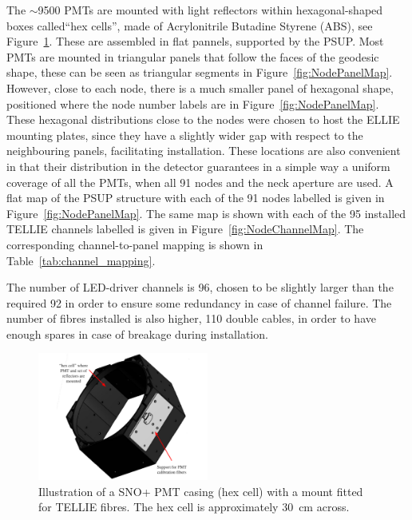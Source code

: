 \documentclass[12pt]{report}
\begin{document}
The $\sim$9500 PMTs are mounted with light reflectors within hexagonal-shaped boxes called``hex cells'', made of Acrylonitrile Butadine Styrene (ABS), see Figure~\ref{fig:HexCell}. These are assembled in flat pannels, supported by the PSUP. Most PMTs are mounted in triangular panels that follow the faces of the geodesic shape, these can be seen as triangular segments in Figure~\ref{fig:NodePanelMap}. However, close to each node, there is a much smaller panel of hexagonal shape, positioned where the node number labels are in Figure~\ref{fig:NodePanelMap}. These hexagonal distributions close to the nodes were chosen to host the ELLIE mounting plates, since they have a slightly wider gap with respect to the neighbouring panels, facilitating installation. These locations are also convenient in that their distribution in the detector guarantees in a simple way a uniform coverage of all the PMTs, when all 91 nodes and the neck aperture are used. A flat map of the PSUP structure with each of the 91 nodes labelled is given in Figure~\ref{fig:NodePanelMap}. The same map is shown with each of the 95 installed TELLIE channels labelled is given in Figure~\ref{fig:NodeChannelMap}. The corresponding channel-to-panel mapping is shown in Table~\ref{tab:channel_mapping}.

The number of LED-driver channels is 96, chosen to be slightly larger than the required 92 in order to ensure some redundancy in case of channel failure. The number of fibres installed is also higher, 110 double cables, in order to have enough spares in case of breakage during installation.

\begin{figure}[htp]
	\begin{center}
		\includegraphics[width=0.5\textwidth]{HexCell}
		\caption{Illustration of a SNO+ PMT casing (hex cell) with a mount fitted for TELLIE fibres. The hex cell is approximately 30~cm across.}
		\label{fig:HexCell}
	\end{center}
\end{figure}
\end{document}
